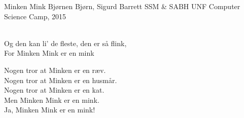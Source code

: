 \begin{song}{Minken Mink}
  {} %
  {Bjørnen Bjørn, Sigurd Barrett} %
  {SSM \& SABH} %
  {UNF Computer Science Camp, 2015} %
  {\NotCCLIed} %

  \begin{SBSection*}
    \\
    Og den kan li' de fleste, den er så flink,\\
    For Minken Mink er en mink
  \end{SBSection*}

  \begin{SBSection*}
    Nogen tror at Minken er en ræv.\\
    Nogen tror at Minken er en husmår.\\
    Nogen tror at Minken er en kat.\\
    Men Minken Mink er en mink.\\
    Ja, Minken Mink er en mink!
  \end{SBSection*}
\end{song}